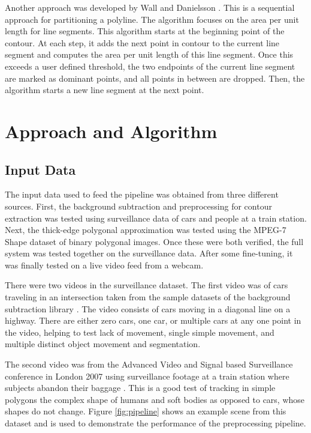 \documentclass[10pt,twocolumn,letterpaper]{article}
\begin{document}
Another approach was developed by Wall and Danielsson \cite{Wall1984}. This is a sequential approach for partitioning a
polyline. The algorithm focuses on the area per unit length for line segments. This algorithm starts at the beginning
point of the contour. At each step, it adds the next point in contour to the current line segment and computes the area
per unit length of this line segment. Once this exceeds a user defined threshold, the two endpoints of the current line
segment are marked as dominant points, and all points in between are dropped. Then, the algorithm starts a new line
segment at the next point.

\section{Approach and Algorithm}

\subsection{Input Data}

The input data used to feed the pipeline was obtained from three different sources. First, the background subtraction
and preprocessing for contour extraction was tested using surveillance data of cars and people at a train station. Next,
the thick-edge polygonal approximation was tested using the MPEG-7 Shape dataset \cite{MPEG-7} of binary polygonal
images. Once these were both verified, the full system was tested together on the surveillance data. After some
fine-tuning, it was finally tested on a live video feed from a webcam.

There were two videos in the surveillance dataset. The first video was of cars traveling in an intersection taken from
the sample datasets of the background subtraction library \cite{bgslibrary}. The video consists of cars moving in a
diagonal line on a highway. There are either zero cars, one car, or multiple cars at any one point in the video, helping
to test lack of movement, single simple movement, and multiple distinct object movement and segmentation.

The second video was from the Advanced Video and Signal based Surveillance conference in London 2007 using surveillance
footage at a train station where subjects abandon their baggage \cite{train_data}. This is a good test of tracking in
simple polygons the complex shape of humans and soft bodies as opposed to cars, whose shapes do not change. Figure
\ref{fig:pipeline} shows an example scene from this dataset and is used to demonstrate the performance of the
preprocessing pipeline.
\end{document}
